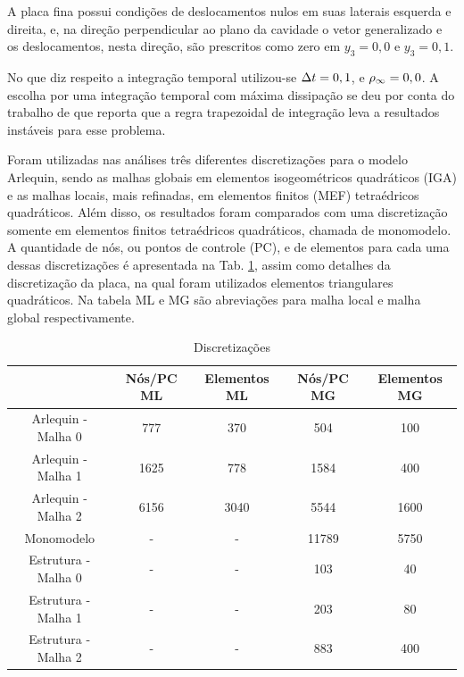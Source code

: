 \documentclass[tese_patricia]{subfiles}
\begin{document}
A placa fina possui condições de deslocamentos nulos em suas laterais esquerda e direita, e, na direção perpendicular ao plano da cavidade o vetor generalizado e os deslocamentos, nesta direção, são prescritos como zero em $y_3=0,0$ e $y_3=0,1$.

No que diz respeito a integração temporal utilizou-se $\Delta t = 0,1$, e $\rho_\infty = 0,0$. A escolha por uma integração temporal com máxima dissipação se deu por conta do trabalho de  que reporta que a regra trapezoidal de integração leva a resultados instáveis para esse problema.

Foram utilizadas nas análises três diferentes discretizações para o modelo Arlequin, sendo as malhas globais em elementos isogeométricos quadráticos (IGA) e as malhas locais, mais refinadas, em elementos finitos (MEF) tetraédricos quadráticos. Além disso, os resultados foram comparados com uma discretização somente em elementos finitos tetraédricos quadráticos, chamada de monomodelo. A quantidade de nós, ou pontos de controle (PC), e de elementos para cada uma dessas discretizações é apresentada na Tab. \ref{tab:CF2DD}, assim como detalhes da discretização da placa, na qual foram utilizados elementos triangulares quadráticos. Na tabela ML e MG são abreviações para malha local e malha global respectivamente.
	
	\begin{center}
		\begin{table}[h!]
			\caption{Discretizações}
			\centering
			\begin{tabular}{|c | c | c| c| c|} 
				\hline
				\ &  Nós/PC ML & Elementos ML & Nós/PC MG & Elementos MG  \\ 
				\hline
				Arlequin - Malha 0 & 777 & 370 & 504 & 100 \\ 
				\hline
				Arlequin - Malha 1 & 1625 & 778 & 1584 & 400\\
				\hline
				Arlequin - Malha 2 & 6156 & 3040 & 5544 & 1600\\
				\hline
				Monomodelo & - & - & 11789 & 5750\\
				\hline
				Estrutura - Malha 0 & - & - &  103 & 40\\
				\hline
				Estrutura - Malha 1 & - & - &  203 & 80\\
				\hline
				Estrutura - Malha 2 & - & - &  883 & 400\\
				\hline
			\end{tabular}
			\label{tab:CF2DD}
		\end{table}
	\end{center}
\end{document}
